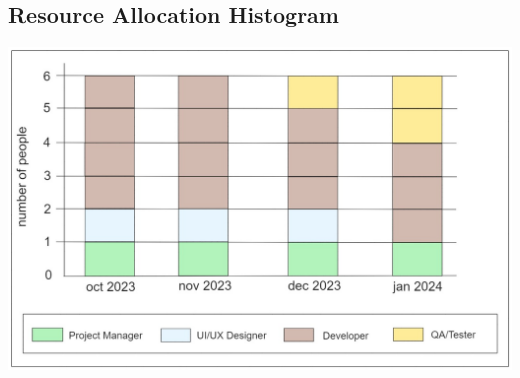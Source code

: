 \documentclass[12pt,titlepage]{article}
\begin{document}
\subsection*{Resource Allocation Histogram}
\includegraphics[width=\textwidth]{images/figures/fig2.jpg}
\end{document}
